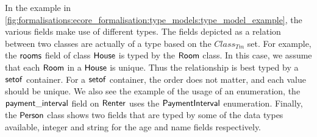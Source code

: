 In the example in \cref{fig:formalisations:ecore_formalisation:type_models:type_model_example}, the various fields make use of different types. The fields depicted as a relation between two classes are actually of a type based on the $Class_{Tm}$ set. For example, the $\mathsf{rooms}$ field of class $\mathsf{House}$ is typed by the $\mathsf{Room}$ class. In this case, we assume that each $\mathsf{Room}$ in a $\mathsf{House}$ is unique. Thus the relationship is best typed by a $\mathsf{setof}$ container. For a $\mathsf{setof}$ container, the order does not matter, and each value should be unique. We also see the example of the usage of an enumeration, the $\mathsf{payment\_interval}$ field on $\mathsf{Renter}$ uses the $\mathsf{PaymentInterval}$ enumeration. Finally, the $\mathsf{Person}$ class shows two fields that are typed by some of the data types available, integer and string for the age and name fields respectively.


